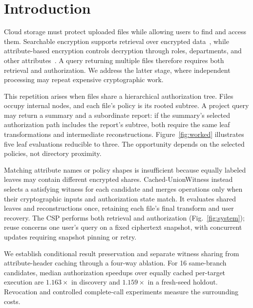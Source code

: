 \documentclass[runningheads]{llncs}
\newif\ifmarkrevisions
\newenvironment{revision}{\par\begingroup\ifmarkrevisions\color{RevisionBlue}\fi}{\par\endgroup}
\begin{document}
\section{Introduction}
\begin{revision}
Cloud storage must protect uploaded files while allowing users to find and
access them. Searchable encryption supports retrieval over encrypted
data~\cite{Song2000EncryptedSearch,Curtmola2006SSE}, while attribute-based
encryption controls decryption through roles, departments, and other
attributes~\cite{Bethencourt2007CPABE,Waters2011CPABE}. A query returning
multiple files therefore requires both retrieval and authorization. We
address the latter stage, where independent processing may repeat expensive
cryptographic work.

This repetition arises when files share a hierarchical authorization tree.
Files occupy internal nodes, and each file's policy is its rooted subtree.
A project query may return a summary and a subordinate report: if the
summary's selected authorization path includes the report's subtree, both
require the same leaf transformations and intermediate reconstructions.
Figure~\ref{fig:worked} illustrates five leaf evaluations reducible to three.
The opportunity depends on the selected policies, not directory proximity.

Matching attribute names or policy shapes is insufficient because equally
labeled leaves may contain different encrypted shares. Cached-UnionWitness
instead selects a satisfying witness for each candidate and merges operations
only when their cryptographic inputs and authorization state match. It
evaluates shared leaves and reconstructions once, retaining each file's final
transform and user recovery. The CSP performs both retrieval and authorization
(Fig.~\ref{fig:system}); reuse concerns one user's query on a fixed ciphertext
snapshot, with concurrent updates requiring snapshot pinning or retry.

We establish conditional result preservation and separate witness sharing
from attribute-header caching through a four-way ablation. For 16 same-branch
candidates, median authorization speedups over equally cached per-target
execution are $1.163\times$ in discovery and $1.159\times$ in a fresh-seed
holdout. Revocation and controlled complete-call experiments measure the
surrounding costs.
\end{revision}
\end{document}
